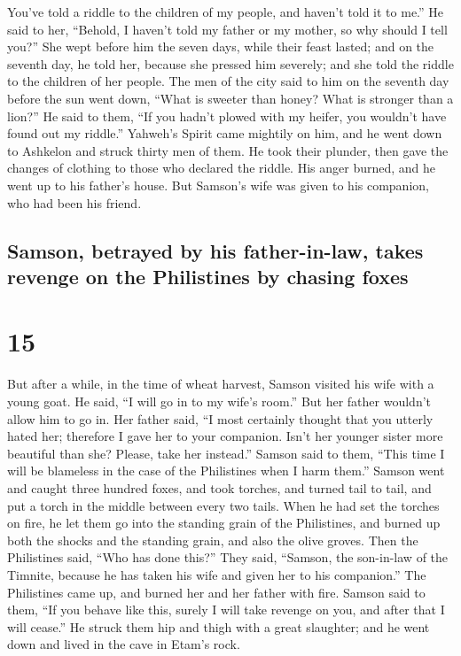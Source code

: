 You've told a riddle to the children of my people, and haven't told it
to me.'' He said to her, ``Behold, I haven't told my father or my
mother, so why should I tell you?''  She wept before him
the seven days, while their feast lasted; and on the seventh day, he
told her, because she pressed him severely; and she told the riddle to
the children of her people.  The men of the city said to
him on the seventh day before the sun went down, ``What is sweeter than
honey? What is stronger than a lion?'' He said to them, ``If you hadn't
plowed with my heifer, you wouldn't have found out my riddle.''
 Yahweh's Spirit came mightily on him, and he went down
to Ashkelon and struck thirty men of them. He took their plunder, then
gave the changes of clothing to those who declared the riddle. His anger
burned, and he went up to his father's house.  But
Samson's wife was given to his companion, who had been his friend.

\hypertarget{samson-betrayed-by-his-father-in-law-takes-revenge-on-the-philistines-by-chasing-foxes}{%
\subsection{Samson, betrayed by his father-in-law, takes revenge on the
Philistines by chasing
foxes}\label{samson-betrayed-by-his-father-in-law-takes-revenge-on-the-philistines-by-chasing-foxes}}

\hypertarget{section-14}{%
\section{15}\label{section-14}}

 But after a while, in the time of wheat harvest, Samson
visited his wife with a young goat. He said, ``I will go in to my wife's
room.'' But her father wouldn't allow him to go in.  Her
father said, ``I most certainly thought that you utterly hated her;
therefore I gave her to your companion. Isn't her younger sister more
beautiful than she? Please, take her instead.''  Samson
said to them, ``This time I will be blameless in the case of the
Philistines when I harm them.''  Samson went and caught
three hundred foxes, and took torches, and turned tail to tail, and put
a torch in the middle between every two tails.  When he
had set the torches on fire, he let them go into the standing grain of
the Philistines, and burned up both the shocks and the standing grain,
and also the olive groves.  Then the Philistines said,
``Who has done this?'' They said, ``Samson, the son-in-law of the
Timnite, because he has taken his wife and given her to his companion.''
The Philistines came up, and burned her and her father with fire.
 Samson said to them, ``If you behave like this, surely I
will take revenge on you, and after that I will cease.'' 
He struck them hip and thigh with a great slaughter; and he went down
and lived in the cave in Etam's rock.

